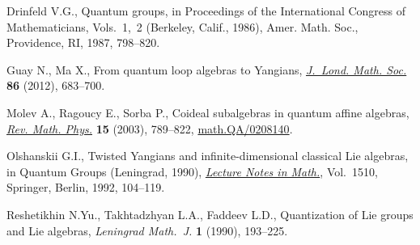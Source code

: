 \documentclass[11pt]{article}
\numberwithin{theorem}{section}
\numberwithin{proposition}{section}
\numberwithin{lemma}{section}
\numberwithin{corollary}{section}
\numberwithin{definition}{section}
\numberwithin{example}{section}
\numberwithin{remark}{section}
\numberwithin{note}{section}
\numberwithin{equation}{section}
\begin{document}
\begin{thebibliography}{99}
Drinfeld V.G., Quantum groups, in Proceedings of the {I}nternational {C}ongress
  of {M}athematicians, {V}ols.~1,~2 ({B}erkeley, {C}alif., 1986), Amer. Math.
  Soc., Providence, RI, 1987, 798--820.

Guay N., Ma X., From quantum loop algebras to {Y}angians, \href{http://dx.doi.org/10.1112/jlms/jds021}{\textit{J.~Lond.
  Math. Soc.}} \textbf{86} (2012), 683--700.

Molev A., Ragoucy E., Sorba P., Coideal subalgebras in quantum af\/f\/ine algebras,
  \href{http://dx.doi.org/10.1142/S0129055X03001813}{\textit{Rev. Math. Phys.}} \textbf{15} (2003), 789--822,
  \href{http://arxiv.org/abs/math.QA/0208140}{math.QA/0208140}.

Olshanskii G.I., Twisted {Y}angians and inf\/inite-dimensional classical {L}ie
  algebras, in Quantum Groups ({L}eningrad, 1990), \href{http://dx.doi.org/10.1007/BFb0101183}{\textit{Lecture Notes in
  Math.}}, Vol.~1510, Springer, Berlin, 1992, 104--119.

Reshetikhin N.Yu., Takhtadzhyan L.A., Faddeev L.D., Quantization of {L}ie groups
  and {L}ie algebras, \textit{Leningrad Math.~J.} \textbf{1} (1990), 193--225.

\end{thebibliography}
\end{document}
